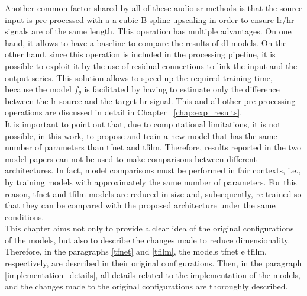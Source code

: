 Another common factor shared by all of these audio \gls{sr} methods is that the source input is pre-processed with a  a cubic B-spline upscaling in order to ensure \gls{lr}/\gls{hr} signals are of the same length. This operation has multiple advantages. On one hand, it allows to have a baseline to compare the results of \gls{dl} models. On the other hand, since this operation is included in the processing pipeline, it is possible to exploit it by the use of residual connections to link the input and the output series. This solution allows to speed up the required training time, because the model  $f_{\theta}$ is facilitated by having to estimate only the difference between the \gls{lr} source and the target \gls{hr} signal. This and all other pre-processing operations are discussed in detail in Chapter ~\ref{chap:exp_results}. \\
It is important to point out that, due to computational limitations, it is not possible, in this work, to propose and train a new model that has the same number of parameters than \gls{tfnet} and \gls{tfilm}. Therefore, results reported in the two model papers can not be used to make comparisons between different architectures. In fact, model comparisons must be performed in fair contexts, i.e., by training models with approximately the same number of parameters. For this reason, \gls{tfnet} and \gls{tfilm} models are
reduced in size and, subsequently, re-trained so that they can be compared with the proposed architecture under the same conditions. \\
This chapter aims not only to provide a clear idea of the original configurations of the models, but also to describe the changes made to reduce dimensionality. Therefore, in the paragraphs \ref{tfnet} and \ref{tfilm}, the models \gls{tfnet} e \gls{tfilm}, respectively, are described in their original configurations. Then, in the paragraph \ref{implementation_details}, all
details related to the implementation of the models, and the changes made to the original configurations are thoroughly described.

